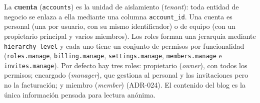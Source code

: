La \textbf{cuenta} (\texttt{accounts}) es la unidad de aislamiento
(\textit{tenant}): toda entidad de negocio se enlaza a ella mediante una
columna \texttt{account\_id}. Una cuenta es personal (una por usuario, con su
mismo identificador) o de equipo (con un propietario principal y varios
miembros). Los roles forman una jerarquía mediante
\texttt{hierarchy\_level} y cada uno tiene un conjunto de permisos por
funcionalidad (\texttt{roles.manage}, \texttt{billing.manage},
\texttt{settings.manage}, \texttt{members.manage} e \texttt{invites.manage}).
Por defecto hay tres roles: propietario (\textit{owner}), con todos los
permisos; encargado (\textit{manager}), que gestiona al personal y las
invitaciones pero no la facturación; y miembro (\textit{member}) (ADR-024).
El contenido del blog es la única información pensada para lectura
anónima.

